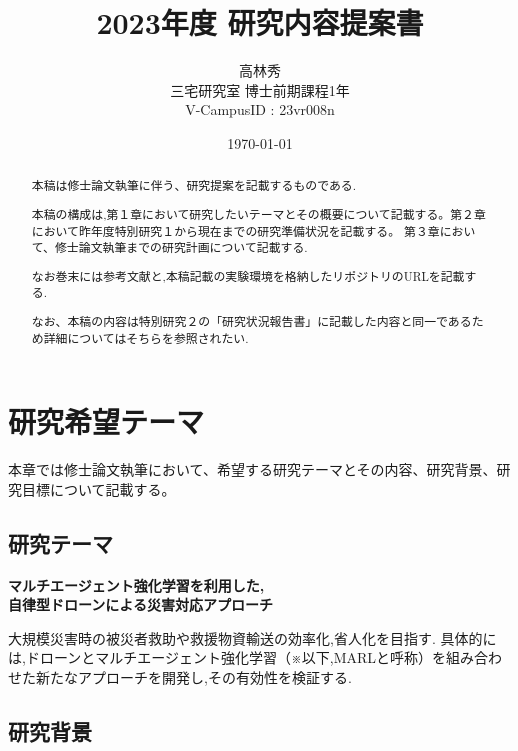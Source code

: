 \documentclass{article}[jsarticle]
\title{2023年度 研究内容提案書}
\author{高林秀 \\ 三宅研究室 博士前期課程1年 \\ V-CampusID : 23vr008n}
\date{\today}
\begin{document}
\maketitle

\begin{abstract}
    本稿は修士論文執筆に伴う、研究提案を記載するものである.\par
    本稿の構成は,第１章において研究したいテーマとその概要について記載する。第２章において昨年度特別研究１から現在までの研究準備状況を記載する。
    第３章において、修士論文執筆までの研究計画について記載する.\par 
    なお巻末には参考文献と,本稿記載の実験環境を格納したリポジトリのURLを記載する.\par 
    なお、本稿の内容は特別研究２の「研究状況報告書」に記載した内容と同一であるため詳細についてはそちらを参照されたい.
\end{abstract}

\tableofcontents

\section{研究希望テーマ}
本章では修士論文執筆において、希望する研究テーマとその内容、研究背景、研究目標について記載する。

\subsection{研究テーマ}
\centerline{
        \textbf{マルチエージェント強化学習を利用した,} \\
        \textbf{自律型ドローンによる災害対応アプローチ}
    }
    大規模災害時の被災者救助や救援物資輸送の効率化,省人化を目指す.
    具体的には,ドローンとマルチエージェント強化学習（※以下,MARLと呼称）を組み合わせた新たなアプローチを開発し,その有効性を検証する.
\subsection{研究背景}
\end{document}
